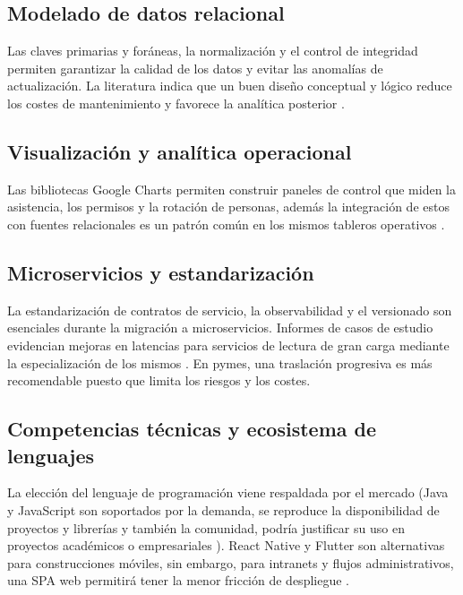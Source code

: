 \subsection{Modelado de datos relacional}
Las claves primarias y foráneas, la normalización y el control de integridad permiten garantizar la calidad de los datos y evitar las anomalías de actualización. La literatura indica que un buen diseño conceptual y lógico reduce los costes de mantenimiento y favorece la analítica posterior \cite{analisis_google_charts}.

\subsection{Visualización y analítica operacional}
Las bibliotecas Google Charts permiten construir paneles de control que miden la asistencia, los permisos y la rotación de personas, además la integración de estos con fuentes relacionales es un patrón común en los mismos tableros operativos \cite{analisis_google_charts}.

\subsection{Microservicios y estandarización}
La estandarización de contratos de servicio, la observabilidad y el versionado son esenciales durante la migración a microservicios. Informes de casos de estudio evidencian mejoras en latencias para servicios de lectura de gran carga mediante la especialización de los mismos \cite{implementacion_microservicios}. En pymes, una traslación progresiva es más recomendable puesto que limita los riesgos y los costes.

\subsection{Competencias técnicas y ecosistema de lenguajes}
La elección del lenguaje de programación viene respaldada por el mercado (Java y JavaScript son soportados por la demanda, se reproduce la disponibilidad de proyectos y librerías y también la comunidad, podría justificar su uso en proyectos académicos o empresariales \cite{analisis_lenguajes}). React Native y Flutter son alternativas para construcciones móviles, sin embargo, para intranets y flujos administrativos, una SPA web permitirá tener la menor fricción de despliegue \cite{react_native_distancias}.